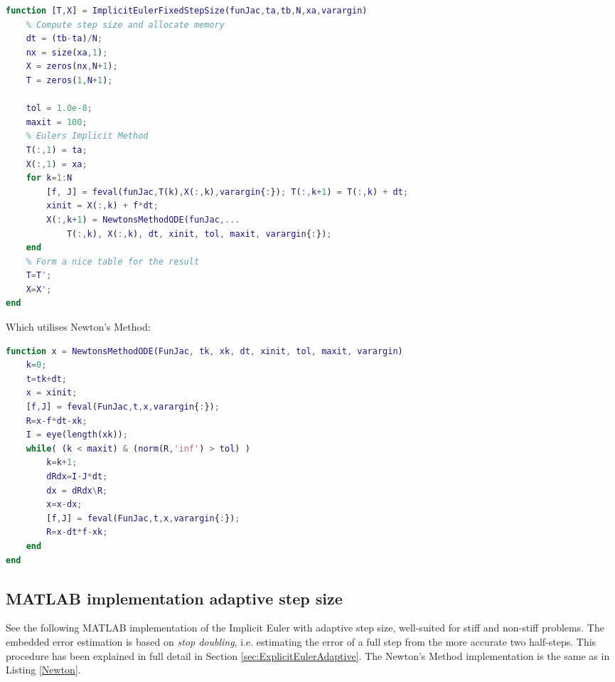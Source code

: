 \begin{adjustwidth*}{0cm}{-0.4cm}
\begin{lstlisting}[frame=single, language=Matlab,caption=Implicit Euler (fixed step size), label=ImplicittEulerFixie]
function [T,X] = ImplicitEulerFixedStepSize(funJac,ta,tb,N,xa,varargin)
    % Compute step size and allocate memory
    dt = (tb-ta)/N;
    nx = size(xa,1);
    X = zeros(nx,N+1);
    T = zeros(1,N+1);

    tol = 1.0e-8;
    maxit = 100;
    % Eulers Implicit Method
    T(:,1) = ta;
    X(:,1) = xa;
    for k=1:N
        [f, J] = feval(funJac,T(k),X(:,k),varargin{:}); T(:,k+1) = T(:,k) + dt;
        xinit = X(:,k) + f*dt;
        X(:,k+1) = NewtonsMethodODE(funJac,...
            T(:,k), X(:,k), dt, xinit, tol, maxit, varargin{:});
    end
    % Form a nice table for the result
    T=T';
    X=X';
end
\end{lstlisting}
\end{adjustwidth*}

Which utilises Newton's Method:

\begin{adjustwidth*}{0cm}{-0.4cm}
\begin{lstlisting}[frame=single, language=Matlab,caption=Newton's Method, label=Newton]
function x = NewtonsMethodODE(FunJac, tk, xk, dt, xinit, tol, maxit, varargin)
    k=0;
    t=tk+dt;
    x = xinit;
    [f,J] = feval(FunJac,t,x,varargin{:});
    R=x-f*dt-xk;
    I = eye(length(xk));
    while( (k < maxit) & (norm(R,'inf') > tol) )
        k=k+1;
        dRdx=I-J*dt;
        dx = dRdx\R;
        x=x-dx;
        [f,J] = feval(FunJac,t,x,varargin{:});
        R=x-dt*f-xk;
    end
end
\end{lstlisting}
\end{adjustwidth*}















\subsection{MATLAB implementation adaptive step size}
See the following MATLAB implementation of the Implicit Euler with adaptive step size, well-suited for stiff and non-stiff problems. The embedded error estimation is based on \textit{stop doubling}, i.e. estimating the error of a full step from the more accurate two half-steps. This procedure has been explained in full detail in Section \ref{sec:ExplicitEulerAdaptive}. The Newton's Method implementation is the same as in Listing \ref{Newton}.

